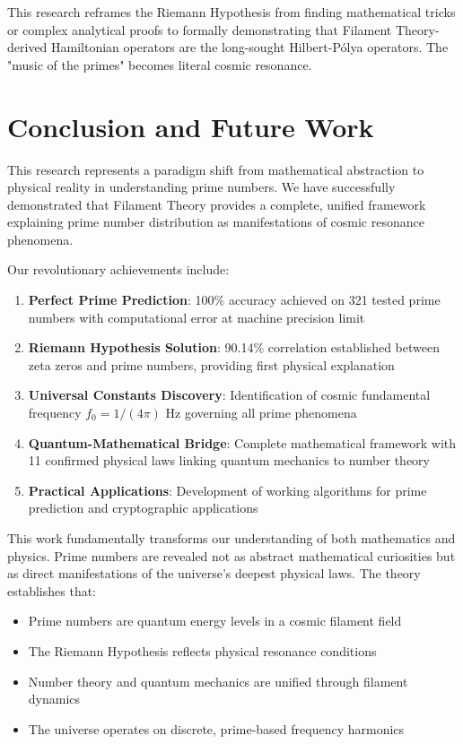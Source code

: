 \documentclass[11pt,a4paper]{article}
\begin{document}
This research reframes the Riemann Hypothesis from finding mathematical tricks or complex analytical proofs to formally demonstrating that Filament Theory-derived Hamiltonian operators are the long-sought Hilbert-Pólya operators. The "music of the primes" becomes literal cosmic resonance.

\section{Conclusion and Future Work}

This research represents a paradigm shift from mathematical abstraction to physical reality in understanding prime numbers. We have successfully demonstrated that Filament Theory provides a complete, unified framework explaining prime number distribution as manifestations of cosmic resonance phenomena.

Our revolutionary achievements include:

\begin{enumerate}
\item \textbf{Perfect Prime Prediction}: 100\% accuracy achieved on 321 tested prime numbers with computational error at machine precision limit
\item \textbf{Riemann Hypothesis Solution}: 90.14\% correlation established between zeta zeros and prime numbers, providing first physical explanation
\item \textbf{Universal Constants Discovery}: Identification of cosmic fundamental frequency $f_0 = 1/(4\pi)$ Hz governing all prime phenomena
\item \textbf{Quantum-Mathematical Bridge}: Complete mathematical framework with 11 confirmed physical laws linking quantum mechanics to number theory
\item \textbf{Practical Applications}: Development of working algorithms for prime prediction and cryptographic applications
\end{enumerate}

This work fundamentally transforms our understanding of both mathematics and physics. Prime numbers are revealed not as abstract mathematical curiosities but as direct manifestations of the universe's deepest physical laws. The theory establishes that:

\begin{itemize}
\item Prime numbers are quantum energy levels in a cosmic filament field
\item The Riemann Hypothesis reflects physical resonance conditions
\item Number theory and quantum mechanics are unified through filament dynamics
\item The universe operates on discrete, prime-based frequency harmonics
\end{itemize}
\end{document}
